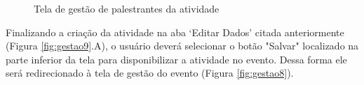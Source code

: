 \begin{figure}[H]
    \centering
    \caption{Tela de gestão de palestrantes da atividade}
    \label{fig:gestao11}
\end{figure}

Finalizando a criação da atividade na aba ‘Editar Dados’ citada anteriormente (Figura \ref{fig:gestao9}.A), o usuário deverá selecionar o botão "Salvar" \hspace{1mm} localizado na parte inferior da tela para disponibilizar a atividade no evento. Dessa forma ele será redirecionado à tela de gestão do evento (Figura \ref{fig:gestao8}).

